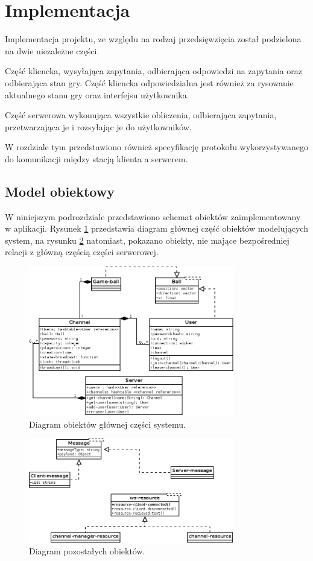 \section{Implementacja}
Implementacja projektu, ze względu na rodzaj przedsięwzięcia został podzielona na dwie niezależne części.

Część kliencka, wysyłająca zapytania, odbierająca odpowiedzi na zapytania oraz odbierająca stan gry. Część kliencka odpowiedzialna jest również za rysowanie aktualnego stanu gry oraz interfejsu użytkownika.

Część serwerowa wykonująca wszystkie obliczenia, odbierająca zapytania, przetwarzająca je i rozsyłając je do użytkowników.

W rozdziale tym przedstawiono również specyfikację protokołu wykorzystywanego do komunikacji między stacją klienta a serwerem.

\subsection{Model obiektowy}
W niniejszym podrozdziale przedstawiono schemat obiektów zaimplementowany w aplikacji. Rysunek \ref{fig:main-obj} przedstawia diagram głównej część obiektów modelujących system, na rysunku \ref{fig:misc-obj} natomiast, pokazano obiekty, nie mające bezpośredniej relacji z główną częścią części serwerowej.
\begin{figure}[ht]
    \centering
    \includegraphics[width=0.8\textwidth]{imgs/main-obj.png}
    \caption{Diagram obiektów głównej części systemu.}
    \label{fig:main-obj}
\end{figure}

\begin{figure}[ht]
    \centering
    \includegraphics[width=0.8\textwidth]{imgs/misc-obj.png}
    \caption{Diagram pozostałych obiektów.}
    \label{fig:misc-obj}
\end{figure}

